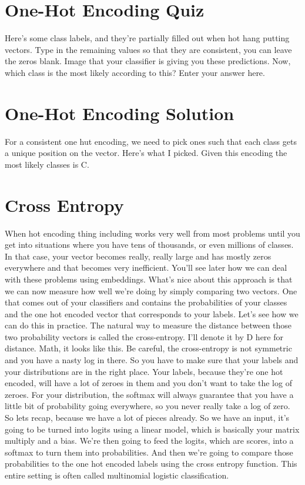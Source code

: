 \documentclass{article}
\begin{document}
\section{One-Hot Encoding Quiz}
Here's some class labels, and
they're partially filled out
when hot hang putting vectors.
Type in the remaining values so
that they are consistent,
you can leave the zeros blank.
Image that your classifier is
giving you these predictions.
Now, which class is the most
likely according to this?
Enter your answer here.
\section{One-Hot Encoding Solution}
For a consistent one hut encoding,
we need to pick ones such that
each class gets a unique
position on the vector.
Here's what I picked.
Given this encoding the most
likely classes is C.
\section{Cross Entropy}
When hot encoding thing including works
very well from most problems until you
get into situations where you
have tens of thousands, or
even millions of classes.
In that case, your vector
becomes really, really large and
has mostly zeros everywhere and
that becomes very inefficient.
You'll see later how we can deal with
these problems using embeddings.
What's nice about this approach is that
we can now measure how well we're doing
by simply comparing two vectors.
One that comes out of your classifiers
and contains the probabilities of your
classes and the one hot encoded vector
that corresponds to your labels.
Let's see how we can
do this in practice.
The natural way to measure the distance
between those two probability vectors is
called the cross-entropy.
I'll denote it by D here for distance.
Math, it looks like this.
Be careful,
the cross-entropy is not symmetric and
you have a nasty log in there.
So you have to make sure
that your labels and
your distributions
are in the right place.
Your labels, because they're one
hot encoded, will have a lot of
zeroes in them and you don't
want to take the log of zeroes.
For your distribution, the softmax will
always guarantee that you have a little
bit of probability going everywhere, so
you never really take a log of zero.
So lets recap,
because we have a lot of pieces already.
So we have an input, it's going to be
turned into logits using a linear model,
which is basically your
matrix multiply and a bias.
We're then going to feed the logits,
which are scores,
into a softmax to turn
them into probabilities.
And then we're going to compare those
probabilities to the one hot encoded
labels using the cross entropy function.
This entire setting is often called
multinomial logistic classification.
\end{document}

